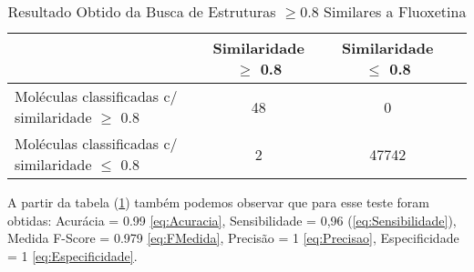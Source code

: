  \begin{table}[!htb]
	\centering
	\footnotesize
	\caption[Resultado Obtido da Busca de Estruturas $\geq$0.8 Similares a Fluoxetina]{Resultado Obtido da Busca de Estruturas $\geq$0.8 Similares a Fluoxetina}
	\label{tab:Fluoxetina}	
	\begin{tabular}{p{4cm}ccc}
		\hline \SPACE
		\textbf{}&\textbf{Similaridade $\geq $ 0.8} & \textbf{Similaridade $\leq $ 0.8} \\ \hline \SPACE
	Moléculas classificadas c/ similaridade $\geq $ 0.8  &	48 & 0 \\ \hline \SPACE
	Moléculas classificadas c/ similaridade $\leq $ 0.8  & 2 & 47742\\ \hline 
	\end{tabular}
\end{table}       
A partir da tabela (\ref{tab:Fluoxetina}) também podemos observar que para esse teste foram obtidas: Acurácia = 0.99 \eqref{eq:Acuracia}, Sensibilidade = 0,96 (\ref{eq:Sensibilidade}), Medida F-Score = 0.979 \eqref{eq:FMedida}, Precisão = 1 \eqref{eq:Precisao},  Especificidade = 1 \eqref{eq:Especificidade}.